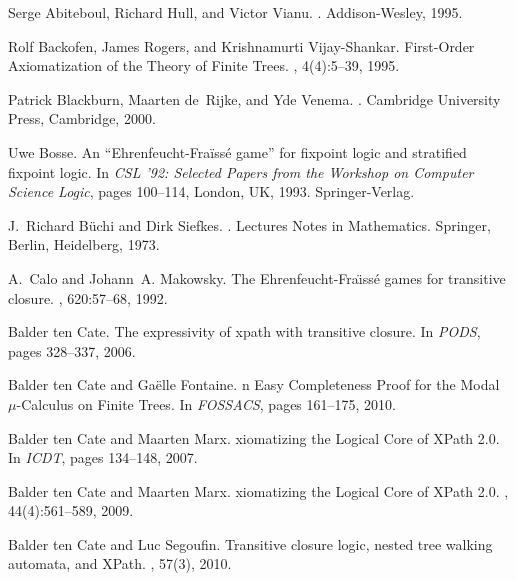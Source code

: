 \documentclass{LMCS}
\begin{document}
\begin{thebibliography}{10}

Serge Abiteboul, Richard Hull, and Victor Vianu.
.
\newblock Addison-Wesley, 1995.

Rolf Backofen, James Rogers, and Krishnamurti Vijay-Shankar.
 {F}irst-{O}rder {A}xiomatization of the {T}heory of {F}inite
  {T}rees.
, 4(4):5--39, 1995.

Patrick Blackburn, Maarten de~Rijke, and Yde Venema.
.
\newblock Cambridge University Press, Cambridge, 2000.

Uwe Bosse.
\newblock An ``{E}hrenfeucht-{F}ra\"{i}ss\'{e} game'' for fixpoint logic and
  stratified fixpoint logic.
\newblock In {\em CSL '92: Selected Papers from the Workshop on Computer
  Science Logic}, pages 100--114, London, UK, 1993. Springer-Verlag.

J.~Richard B\"{u}chi and Dirk Siefkes.
.
\newblock Lectures Notes in Mathematics. Springer, Berlin, Heidelberg, 1973.

A.~Calo and Johann~A. Makowsky.
\newblock The {E}hrenfeucht-{F}ra\"{\i}ss\'e games for transitive closure.
, 620:57--68, 1992.

{Balder ten} Cate.
\newblock The expressivity of xpath with transitive closure.
\newblock In {\em PODS}, pages 328--337, 2006.

{Balder ten} Cate and Ga{\"e}lle Fontaine.
n {E}asy {C}ompleteness {P}roof for the {M}odal $\mu$-{C}alculus
  on {F}inite {T}rees.
\newblock In {\em FOSSACS}, pages 161--175, 2010.

{Balder ten} Cate and Maarten Marx.
xiomatizing the {L}ogical {C}ore of {X}{P}ath 2.0.
\newblock In {\em ICDT}, pages 134--148, 2007.

{Balder ten} Cate and Maarten Marx.
xiomatizing the {L}ogical {C}ore of {X}{P}ath 2.0.
, 44(4):561--589, 2009.

{Balder ten} Cate and Luc Segoufin.
\newblock Transitive closure logic, nested tree walking automata, and
  {X}{P}ath.
, 57(3), 2010.


\end{thebibliography}
\end{document}
